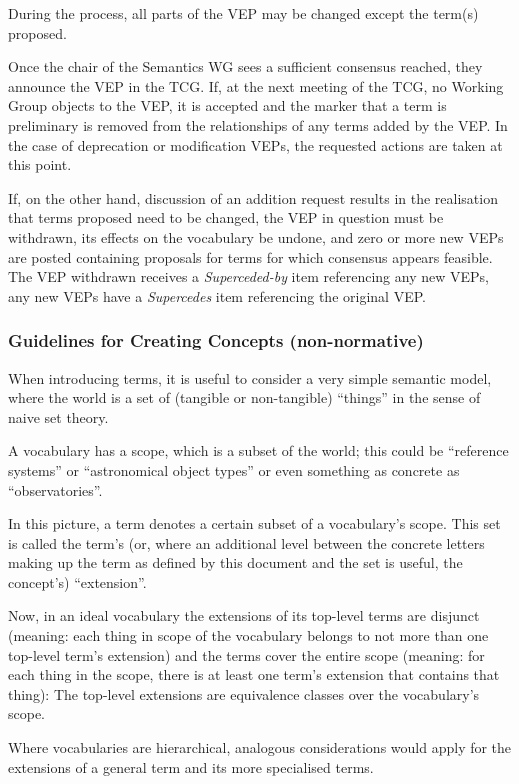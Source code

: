 \documentclass[11pt,a4paper]{ivoa}
\newcommand{\vepitem}[1]{\emph{#1}}
\begin{document}
During the process, all parts of the VEP may be changed except the
term(s) proposed.

Once the chair of the Semantics WG sees a sufficient consensus reached,
they announce the VEP in the TCG.  If, at the next meeting of the TCG,
no Working Group objects to the VEP, it is accepted and the marker that
a term is preliminary is removed from the relationships of any terms
added by the VEP.  In the case of deprecation or modification VEPs, the
requested actions are taken at this point.

If, on the other hand, discussion of an addition request results in the
realisation that terms proposed need to be changed, the VEP in question
must be withdrawn, its effects on the vocabulary be undone, and zero or
more new VEPs are posted containing proposals for terms for which
consensus appears feasible.  The VEP withdrawn receives a
\vepitem{Superceded-by} item referencing any new VEPs, any new VEPs have
a \vepitem{Supercedes} item referencing the original VEP.

\subsubsection{Guidelines for Creating Concepts (non-normative)}

When introducing terms, it is useful to consider a very simple
semantic model, where the world is a set of (tangible or non-tangible)
``things'' in the sense of naive set theory.

A vocabulary has a scope, which is a subset of the world; this could be
``reference systems'' or ``astronomical object types'' or even something
as concrete as ``observatories''.

In this picture, a term denotes a certain subset of a vocabulary's
scope.  This set is called the term's (or, where an additional level
between the concrete letters making up the term as defined by this
document and the set is useful, the concept's) ``extension''.

Now, in an ideal vocabulary the extensions of its
top-level terms are disjunct (meaning: each thing in scope of the vocabulary
belongs to not more than one top-level term's extension) and the terms cover the
entire scope (meaning: for each thing in the scope, there is at least
one term's extension that contains that thing): The top-level extensions are
equivalence classes over the vocabulary's scope.

Where vocabularies are hierarchical, analogous considerations would
apply for the extensions of a general term and its more specialised
terms.
\end{document}
